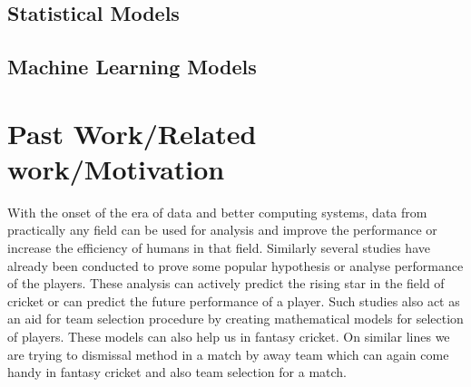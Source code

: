 \documentclass[fleqn,10pt]{wlscirep}
\begin{document}
\subsection{Statistical Models}
\subsection{Machine Learning Models}
\section{Past Work/Related work/Motivation}
With the onset of the era of data and better computing systems, data from practically any field can be used for analysis and 
improve the performance or increase the efficiency of humans in that field. Similarly several studies have already been conducted to prove some popular 
hypothesis or analyse performance of the players. These analysis can actively predict the rising star in the field of cricket or can predict the 
future performance of a player. Such studies also act as an aid for team selection procedure by creating mathematical models for selection of players.
These models can also help us in fantasy cricket.
On similar lines we are trying to dismissal method in a match by away team which can again come handy in fantasy cricket and also team selection for a match.
\end{document}
